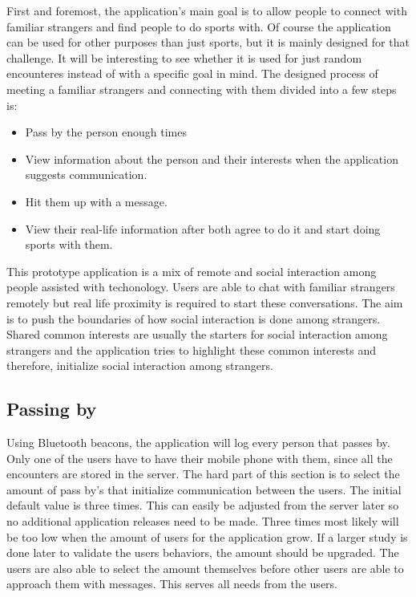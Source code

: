 First and foremost, the application's main goal is to allow people to connect with familiar strangers and find people to do sports with. Of course the application can be used for other purposes than just sports, but it is mainly designed for that challenge. It will be interesting to see whether it is used for just random encounteres instead of with a specific goal in mind. The designed process of meeting a familiar strangers and connecting with them divided into a few steps is:

\begin{itemize}
	\item Pass by the person enough times
	\item View information about the person and their interests when the application suggests communication.
	\item Hit them up with a message.
	\item View their real-life information after both agree to do it and start doing sports with them.
\end{itemize}

This prototype application is a mix of remote and social interaction among people assisted with techonology. Users are able to chat with familiar strangers remotely but real life proximity is required to start these conversations. The aim is to push the boundaries of how social interaction is done among strangers. Shared common interests are usually the starters for social interaction among strangers and the application tries to highlight these common interests and therefore, initialize social interaction among strangers.

\subsection{Passing by}

Using Bluetooth beacons, the application will log every person that passes by. Only one of the users have to have their mobile phone with them, since all the encounters are stored in the server. The hard part of this section is to select the amount of pass by's that initialize communication between the users. The initial default value is three times. This can easily be adjusted from the server later so no additional application releases need to be made. Three times most likely will be too low when the amount of users for the application grow. If a larger study is done later to validate the users behaviors, the amount should be upgraded. The users are also able to select the amount themselves before other users are able to approach them with messages. This serves all needs from the users.

